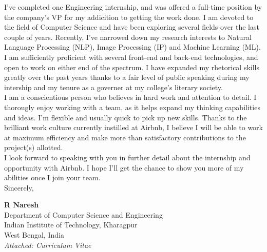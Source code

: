 \documentclass[a4paper,10pt]{extarticle} %
\begin{document}
I’ve completed one Engineering internship, and was offered a full-time position by the company's VP for my addicition to getting the work done. I am devoted to the field of Computer Science and have been exploring several fields over the last couple of years. Recently, I've narrowed down my research interests to Natural Language Processing (NLP), Image Processing (IP) and Machine Learning (ML). I am sufficiently proficient with several front-end and back-end technologies, and open to work on either end of the spectrum. I have expanded my rhetorical skills greatly over the past years thanks to a fair level of public speaking during my intership and my tenure as a governer at my college's literary society. \\

I am a conscientious person who believes in hard work and attention to detail. I thorougly enjoy working with a team, as it helps expand my thinking capabilities and ideas. I'm flexible and usually quick to pick up new skills. Thanks to the brilliant work culture currently instilled at Airbnb, I believe I will be able to work at maximum efficiency and make more than satisfactory contributions to the project(s) allotted.\\

I look forward to speaking with you in further detail about the internship and opportunity with Airbnb. I hope I’ll get the chance to show you more of my abilities once I join your team.\\

Sincerely,

\textbf{\large{R Naresh}}\\
Department of Computer Science and Engineering\\
Indian Institute of Technology, Kharagpur\\
West Bengal, India\\

\itshape{Attached: Curriculum Vitae}
\end{document}
